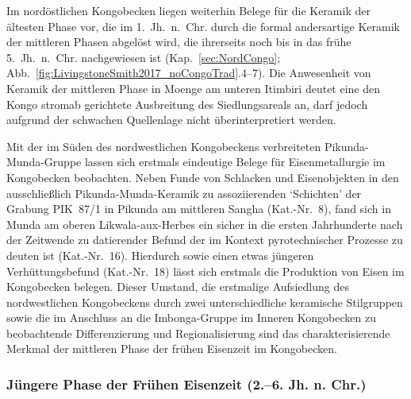 Im nordöstlichen Kongobecken liegen weiterhin Belege für die Keramik der ältesten Phase vor, die im 1.~Jh.~n.~Chr. durch die formal andersartige Keramik der mittleren Phasen abgelöst wird, die ihrerseits noch bis in das frühe 5.~Jh.~n.~Chr. nachgewiesen ist (Kap.~\ref{sec:NordCongo}; Abb.~\ref{fig:LivingstoneSmith2017_noCongoTrad}.4--7). Die Anwesenheit von Keramik der mittleren Phase in Moenge am unteren Itimbiri deutet eine den Kongo stromab gerichtete Ausbreitung des Siedlungsareals an, darf jedoch aufgrund der schwachen Quellenlage nicht überinterpretiert werden.

Mit der im Süden des nordwestlichen Kongobeckens verbreiteten Pikunda-Munda-Gruppe lassen sich erstmals eindeutige Belege für Eisenmetallurgie im Kongobecken beobachten. Neben Funde von Schlacken und Eisenobjekten in den ausschließlich Pikunda-Munda-Keramik zu assoziierenden \enquote*{Schichten} der Grabung PIK~87/1 in Pikunda am mittleren Sangha (Kat.-Nr.~8), fand sich in Munda am oberen Likwala-aux-Herbes ein sicher in die ersten Jahrhunderte nach der Zeitwende zu datierender Befund der im Kontext pyrotechnischer Prozesse zu deuten ist (Kat.-Nr.~16). Hierdurch sowie einen etwas jüngeren Verhüttungsbefund (Kat.-Nr.~18) lässt sich erstmals die Produktion von Eisen im Kongobecken belegen. Dieser Umstand, die erstmalige Aufsiedlung des nordwestlichen Kongobeckens durch zwei unterschiedliche keramische Stilgruppen sowie die im Anschluss an die Imbonga-Gruppe im Inneren Kongobecken zu beobachtende Differenzierung und Regionalisierung sind das charakterisierende Merkmal der mittleren Phase der frühen Eisenzeit im Kongobecken.\clearpage

\subsubsection*{Jüngere Phase der Frühen Eisenzeit (2.--6. Jh. n. Chr.)}


